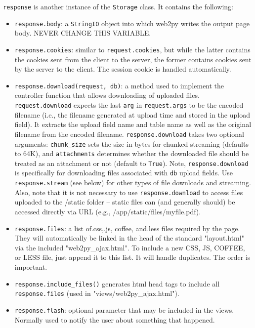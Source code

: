\documentclass[justified,sixbynine,notoc]{tufte-book}
\def\ft{\small\tt}
\begin{document}
\begin{fullwidth}
{\ft response} is another instance of the {\ft Storage} class. It contains the following:

\begin{itemize}
\item {\ft response.body}: a {\ft StringIO} object into which web2py writes the output page body. NEVER CHANGE THIS VARIABLE.

\item {\ft response.cookies}: similar to {\ft request.cookies}, but while the latter contains the cookies sent from the client to the server, the former contains cookies sent by the server to the client. The session cookie is handled automatically.

\item {\ft response.download(request, db)}: a method used to implement the controller function that allows downloading of uploaded files. {\ft request.download} expects the last {\ft arg} in {\ft request.args} to be the encoded filename (i.e., the filename generated at upload time and stored in the upload field). It extracts the upload field name and table name as well as the original filename from the encoded filename. {\ft response.download} takes two optional arguments: {\ft chunk\_size} sets the size in bytes for chunked streaming (defaults to 64K), and {\ft attachments} determines whether the downloaded file should be treated as an attachment or not (default to {\ft True}). Note, {\ft response.download} is specifically for downloading files associated with {\ft db} upload fields. Use {\ft response.stream} (see below) for other types of file downloads and streaming. Also, note that it is not necessary to use {\ft response.download} to access files uploaded to the /static folder -- static files can (and generally should) be accessed directly via URL (e.g., /app/static/files/myfile.pdf).

\item {\ft response.files}: a list of.css,.js, coffee, and.less files required by the page. They will automatically be linked in the head of the standard "layout.html" via the included "web2py\_ajax.html". To include a new CSS, JS, COFFEE, or LESS file, just append it to this list. It will handle duplicates. The order is important.

\item {\ft response.include\_files()} generates html head tags to include all {\ft response.files} (used in "views/web2py\_ajax.html").

\item {\ft response.flash}: optional parameter that may be included in the views. Normally used to notify the user about something that happened.


\end{itemize}
\end{fullwidth}
\end{document}
